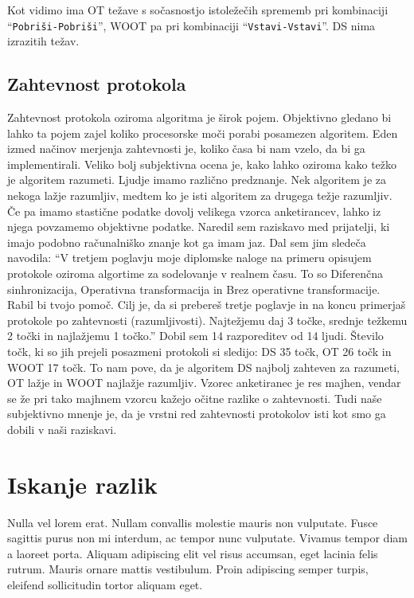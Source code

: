 \documentclass[a4paper, 12pt, twoside]{book}
\begin{document}
Kot vidimo ima OT težave s sočasnostjo istoležečih sprememb pri kombinaciji “{\tt Pobriši-Pobriši}”, WOOT pa pri kombinaciji “{\tt Vstavi-Vstavi}”. DS nima izrazitih težav.

\section{Zahtevnost protokola}

Zahtevnost protokola oziroma algoritma je širok pojem. Objektivno gledano bi lahko ta pojem zajel koliko procesorske moči porabi posamezen algoritem. Eden izmed načinov merjenja zahtevnosti je, koliko časa bi nam vzelo, da bi ga implementirali. Veliko bolj subjektivna ocena je, kako lahko oziroma kako težko je algoritem razumeti. Ljudje imamo različno predznanje. Nek algoritem je za nekoga lažje razumljiv, medtem ko je isti algoritem za drugega težje razumljiv. Če pa imamo stastične podatke dovolj velikega vzorca anketirancev, lahko iz njega povzamemo objektivne podatke. Naredil sem raziskavo med prijatelji, ki imajo podobno računalniško znanje kot ga imam jaz. Dal sem jim sledeča navodila: “V tretjem poglavju moje diplomske naloge na primeru opisujem protokole oziroma algortime za sodelovanje v realnem času. To so Diferenčna sinhronizacija, Operativna transformacija in Brez operativne transformacije. Rabil bi tvojo pomoč. Cilj je, da si prebereš tretje poglavje in na koncu primerjaš protokole po zahtevnosti (razumljivosti). Najtežjemu daj 3 točke, srednje težkemu 2 točki in najlažjemu 1 točko.” Dobil sem 14 razporeditev od 14 ljudi. Število točk, ki so jih prejeli posazmeni protokoli si sledijo: DS 35 točk, OT 26 točk in WOOT 17 točk. To nam pove, da je algoritem DS najbolj zahteven za razumeti, OT lažje in WOOT najlažje razumljiv. Vzorec anketiranec je res majhen, vendar se že pri tako majhnem vzorcu kažejo očitne razlike o zahtevnosti. Tudi naše subjektivno mnenje je, da je vrstni red zahtevnosti protokolov isti kot smo ga dobili v naši raziskavi.

\chapter{Iskanje razlik}
\label{chp:diff}

Nulla vel lorem erat. Nullam convallis molestie mauris non vulputate. Fusce sagittis purus non mi interdum, ac tempor nunc vulputate. Vivamus tempor diam a laoreet porta. Aliquam adipiscing elit vel risus accumsan, eget lacinia felis rutrum. Mauris ornare mattis vestibulum. Proin adipiscing semper turpis, eleifend sollicitudin tortor aliquam eget.
\end{document}

